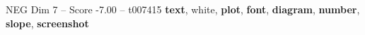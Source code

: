 \begin{textsample}{NEG Dim 7 – Score -7.00 – t007415}  \label{ex:f7_neg_024}
\textbf{text}, white, \textbf{plot}, \textbf{font}, \textbf{diagram}, \textbf{number}, \textbf{slope}, \textbf{screenshot}

\end{textsample}
